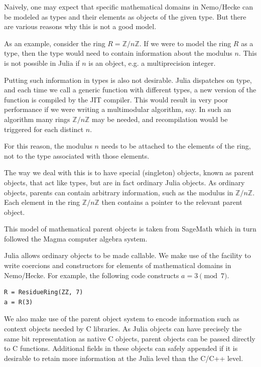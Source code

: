 \documentclass{sig-alternate-05-2015}
\begin{document}
Naively, one may expect that specific mathematical domains in Nemo/Hecke can be modeled as types
and their elements as objects of the given type. But there are various reasons why this is not a
good model.

As an example, consider the ring $R = \mathbb{Z}/n\mathbb{Z}$. If we were to model the ring $R$
as a type, then the type would need to contain information about the modulus $n$. This is not
possible in Julia if $n$ is an object, e.g. a multiprecision integer.

Putting such information in types is also not desirable. Julia dispatches on type, and each time
we call a generic function with different types, a new version of the function is compiled by the
JIT compiler. This would result in very poor performance if we were writing a multimodular
algorithm, say. In such an algorithm many rings $\mathbb{Z}/n\mathbb{Z}$ may be needed, and
recompilation would be triggered for each distinct $n$.

For this reason, the modulus $n$ needs to be attached to the elements of the ring, not to the type
associated with those elements.

The way we deal with this is to have special (singleton) objects, known as parent objects, that act
like types, but are in fact ordinary Julia objects. As ordinary objects, parents can contain
arbitrary information, such as the modulus in $\mathbb{Z}/n\mathbb{Z}$. Each element in the ring
$\mathbb{Z}/n\mathbb{Z}$ then contains a pointer to the relevant parent object.

This model of mathematical parent objects is taken from SageMath \cite{sage} which in turn followed
the Magma \cite{magma} computer algebra system.

Julia allows ordinary objects to be made callable. We make use of the facility to write coercions
and constructors for elements of mathematical domains in Nemo/Hecke. For example, the following
code constructs $a = 3 \pmod{7}$.

\begin{verbatim}
R = ResidueRing(ZZ, 7)
a = R(3)
\end{verbatim}

We also make use of the parent object system to encode information such as context objects needed
by C libraries. As Julia objects can have precisely the same bit representation as native C objects,
parent objects can be passed directly to C functions. Additional fields in these objects can safely
appended if it is desirable to retain more information at the Julia level than the C/C++ level. 
\end{document}
